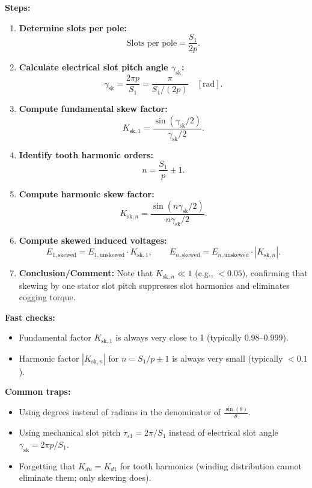 \textbf{Steps:}
\begin{enumerate}
  \item \textbf{Determine slots per pole:}
  \[
  \text{Slots per pole} = \frac{S_1}{2p}.
  \]
  \item \textbf{Calculate electrical slot pitch angle $\gamma_{\mathrm{sk}}$:}
  \[
  \gamma_{\mathrm{sk}} = \frac{2\pi p}{S_1} = \frac{\pi}{S_1/(2p)} \quad [\mathrm{rad}].
  \]
  \item \textbf{Compute fundamental skew factor:}
  \[
  K_{\mathrm{sk},1} = \frac{\sin(\gamma_{\mathrm{sk}}/2)}{\gamma_{\mathrm{sk}}/2}.
  \]
  \item \textbf{Identify tooth harmonic orders:}
  \[
  n = \frac{S_1}{p} \pm 1.
  \]
  \item \textbf{Compute harmonic skew factor:}
  \[
  K_{\mathrm{sk},n} = \frac{\sin(n\gamma_{\mathrm{sk}}/2)}{n\gamma_{\mathrm{sk}}/2}.
  \]
  \item \textbf{Compute skewed induced voltages:}
  \[
  E_{1,\mathrm{skewed}} = E_{1,\mathrm{unskewed}}\cdot K_{\mathrm{sk},1}, \qquad E_{n,\mathrm{skewed}} = E_{n,\mathrm{unskewed}}\cdot |K_{\mathrm{sk},n}|.
  \]
  \item \textbf{Conclusion/Comment:} Note that $K_{\mathrm{sk},n} \ll 1$ (e.g., $< 0.05$), confirming that skewing by one stator slot pitch suppresses slot harmonics and eliminates cogging torque.
\end{enumerate}

\textbf{Fast checks:}
\begin{itemize}
  \item Fundamental factor $K_{\mathrm{sk},1}$ is always very close to 1 (typically $0.98\text{--}0.999$).
  \item Harmonic factor $|K_{\mathrm{sk},n}|$ for $n = S_1/p \pm 1$ is always very small (typically $< 0.1$).
\end{itemize}

\textbf{Common traps:}
\begin{itemize}
  \item Using degrees instead of radians in the denominator of $\frac{\sin(\theta)}{\theta}$.
  \item Using mechanical slot pitch $\tau_{s1} = 2\pi / S_1$ instead of electrical slot angle $\gamma_{\mathrm{sk}} = 2\pi p / S_1$.
  \item Forgetting that $K_{dn} = K_{d1}$ for tooth harmonics (winding distribution cannot eliminate them; only skewing does).
\end{itemize}
